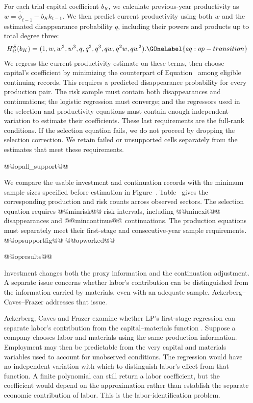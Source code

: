 For each trial capital coefficient $b_K$, we calculate previous-year productivity as $w=\widehat\phi_{t-1}-b_Kk_{t-1}$. We then predict current productivity using both $w$ and the estimated disappearance probability $q$, including their powers and products up to total degree three:
\begin{equation}
H^S_{it}(b_K)=(1,w,w^2,w^3,q,q^2,q^3,qw,q^2w,qw^2).
\GOneLabel{eq:op-transition}
\end{equation}
We regress the current productivity estimate on these terms, then choose capital's coefficient by minimizing the counterpart of Equation~ among eligible continuing records. This requires a predicted disappearance probability for every production pair. The risk sample must contain both disappearances and continuations; the logistic regression must converge; and the regressors used in the selection and productivity equations must contain enough independent variation to estimate their coefficients. These last requirements are the full-rank conditions. If the selection equation fails, we do not proceed by dropping the selection correction. We retain failed or unsupported cells separately from the estimates that meet these requirements.

@@opall_support@@

We compare the usable investment and continuation records with the minimum sample sizes specified before estimation in Figure~. Table~ gives the corresponding production and risk counts across observed sectors. The selection equation requires @@minrisk@@ risk intervals, including @@minexit@@ disappearances and @@mincontinue@@ continuations. The production equations must separately meet their first-stage and consecutive-year sample requirements.
@@opsupportfig@@
@@opworked@@

@@opresults@@

Investment changes both the proxy information and the continuation adjustment. A separate issue concerns whether labor's contribution can be distinguished from the information carried by materials, even with an adequate sample. Ackerberg--Caves--Frazer addresses that issue.

Ackerberg, Caves and Frazer examine whether LP's first-stage regression can separate labor's contribution from the capital--materials function \citep{acf}. Suppose a company chooses labor and materials using the same production information. Employment may then be predictable from the very capital and materials variables used to account for unobserved conditions. The regression would have no independent variation with which to distinguish labor's effect from that function. A finite polynomial can still return a labor coefficient, but the coefficient would depend on the approximation rather than establish the separate economic contribution of labor. This is the labor-identification problem.

